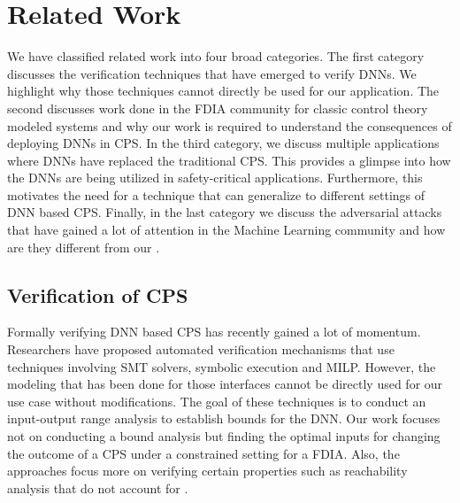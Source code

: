 \chapter{Related Work}



We have classified related work into four broad categories. The first category discusses the verification techniques that have emerged to verify DNNs. We highlight why those techniques cannot directly be used for our application. The second discusses work done in the FDIA community for classic control theory modeled systems and why our work is required to understand the consequences of deploying DNNs in CPS.  In the third category, we discuss multiple applications where DNNs have replaced the traditional CPS. This provides a glimpse into how the DNNs are being utilized in safety-critical applications. Furthermore, this motivates the need for a technique that can generalize to different settings of DNN based CPS. Finally, in the last category we discuss the adversarial attacks that have gained a lot of attention in the Machine Learning community and how are they different from our \attack. 


\section{Verification of CPS}
Formally verifying DNN based CPS has recently gained a lot of momentum. Researchers have proposed automated verification mechanisms that use techniques involving SMT solvers, symbolic execution and MILP. However, the modeling that has been done for those interfaces cannot be directly used for our use case without modifications. The goal of these techniques is to conduct an input-output range analysis to establish bounds for the DNN. Our work focuses not on conducting a bound analysis but finding the optimal inputs for changing the outcome of a CPS under a constrained setting for a FDIA. Also, the approaches focus more on verifying certain properties such as reachability analysis that do not account for \attack.

